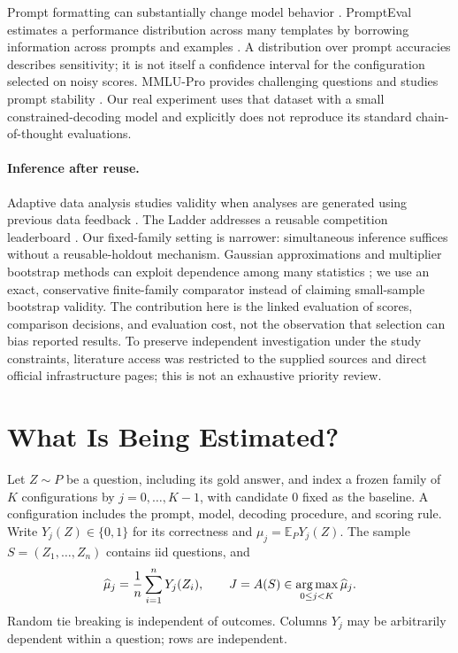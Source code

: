 \documentclass{article}
\newcommand{\E}{\mathbb{E}}
\newcommand{\muh}{\widehat\mu}
\newcommand{\argmax}{\mathop{\rm arg\,max}}
\begin{document}
Prompt formatting can substantially change model behavior \citep{sclar2024quantifying}. PromptEval estimates a performance distribution across many templates by borrowing information across prompts and examples \citep{polo2024efficient}. A distribution over prompt accuracies describes sensitivity; it is not itself a confidence interval for the configuration selected on noisy scores. MMLU-Pro provides challenging questions and studies prompt stability \citep{wang2024mmlu}. Our real experiment uses that dataset with a small constrained-decoding model and explicitly does not reproduce its standard chain-of-thought evaluations.

\paragraph{Inference after reuse.}
Adaptive data analysis studies validity when analyses are generated using previous data feedback \citep{dwork2015preserving}. The Ladder addresses a reusable competition leaderboard \citep{blum2015ladder}. Our fixed-family setting is narrower: simultaneous inference suffices without a reusable-holdout mechanism. Gaussian approximations and multiplier bootstrap methods can exploit dependence among many statistics \citep{chernozhukov2013gaussian}; we use an exact, conservative finite-family comparator instead of claiming small-sample bootstrap validity. The contribution here is the linked evaluation of scores, comparison decisions, and evaluation cost, not the observation that selection can bias reported results. To preserve independent investigation under the study constraints, literature access was restricted to the supplied sources and direct official infrastructure pages; this is not an exhaustive priority review.

\section{What Is Being Estimated?}
Let $Z\sim P$ be a question, including its gold answer, and index a frozen family of $K$ configurations by $j=0,\ldots,K-1$, with candidate 0 fixed as the baseline. A configuration includes the prompt, model, decoding procedure, and scoring rule. Write $Y_j(Z)\in\{0,1\}$ for its correctness and $\mu_j=\E_PY_j(Z)$. The sample $S=(Z_1,\ldots,Z_n)$ contains iid questions, and
\begin{equation}
 \muh_j=\frac1n\sum_{i=1}^nY_j(Z_i),\qquad
 J=A(S)\in\argmax_{0\leq j<K}\muh_j.
 \label{eq:selection}
\end{equation}
Random tie breaking is independent of outcomes. Columns $Y_j$ may be arbitrarily dependent within a question; rows are independent.
\end{document}
